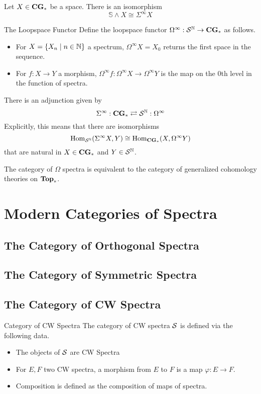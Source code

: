 \documentclass[a4paper]{article}
\begin{document}
\begin{prp}{}{} Let $X\in\bold{CG}_\ast$ be a space. There is an isomorphism $$\mathbb{S}\wedge X\cong\Sigma^\infty X$$
\end{prp}

\begin{defn}{The Loopspace Functor}{} Define the loopspace functor $\Omega^\infty:\mathcal{S}^{\mathbb{N}}\to\bold{CG}_\ast$ as follows. 
\begin{itemize}
\item For $X=\{X_n\;|\;n\in\mathbb{N}\}$ a spectrum, $\Omega^\infty X=X_0$ returns the first space in the sequence. 
\item For $f:X\to Y$ a morphism, $\Omega^\infty f:\Omega^\infty X\to\Omega^\infty Y$ is the map on the $0$th level in the function of spectra. 
\end{itemize}
\end{defn}

\begin{thm}{}{} There is an adjunction given by $$\Sigma^\infty:\bold{CG}_\ast\rightleftarrows\mathcal{S}^{\mathbb{N}} :\Omega^\infty$$ Explicitly, this means that there are isomorphisms $$\operatorname{Hom}_{\mathcal{S}^{\mathbb{N}} }(\Sigma^\infty X,Y)\cong\operatorname{Hom}_{\bold{CG}_\ast}(X,\Omega^\infty Y)$$ that are natural in $X\in\bold{CG}_\ast$ and $Y\in\mathcal{S}^{\mathbb{N}} $. 
\end{thm}

\begin{thm}{}{} The category of $\Omega$ spectra is equivalent to the category of generalized cohomology theories on $\bold{Top}_\ast$. 
\end{thm}

\pagebreak
\section{Modern Categories of Spectra}
\subsection{The Category of Orthogonal Spectra}
\subsection{The Category of Symmetric Spectra}
\subsection{The Category of CW Spectra}
\begin{defn}{Category of CW Spectra}{} The category of CW spectra $\mathcal{S}$ is defined via the following data. 
\begin{itemize}
\item The objects of $\mathcal{S}$ are CW Spectra
\item For $E,F$ two CW spectra, a morphism from $E$ to $F$ is a map $\varphi:E\to F$. 
\item Composition is defined as the composition of maps of spectra. 
\end{itemize}
\end{defn}
\end{document}
